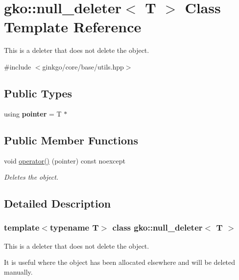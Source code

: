 \hypertarget{classgko_1_1null__deleter}{}\section{gko\+:\+:null\+\_\+deleter$<$ T $>$ Class Template Reference}
\label{classgko_1_1null__deleter}


This is a deleter that does not delete the object.  




{\ttfamily \#include $<$ginkgo/core/base/utils.\+hpp$>$}

\subsection*{Public Types}
\begin{DoxyCompactItemize}
\item 
\mbox{\label{classgko_1_1null__deleter_a07da79e3ea35a385173550a451b59bcf}} 
using {\bfseries pointer} = T $\ast$
\end{DoxyCompactItemize}
\subsection*{Public Member Functions}
\begin{DoxyCompactItemize}
\item 
void \hyperlink{classgko_1_1null__deleter_a09fc153e500a30edaa572f2c6cb674ab}{operator()} (pointer) const noexcept
\begin{DoxyCompactList}\small\item\em Deletes the object. \end{DoxyCompactList}\end{DoxyCompactItemize}


\subsection{Detailed Description}
\subsubsection*{template$<$typename T$>$\newline
class gko\+::null\+\_\+deleter$<$ T $>$}

This is a deleter that does not delete the object. 

It is useful where the object has been allocated elsewhere and will be deleted manually. 

